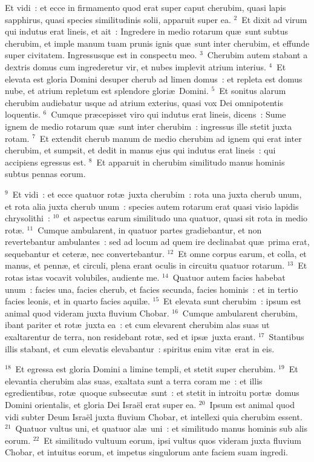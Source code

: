 \bchapter
\lettrine[lines=3,image=true,loversize=0.05,lraise=-0.03]{E}{}t vidi~: et ecce in firmamento quod erat super caput cherubim, quasi lapis sapphirus, quasi species similitudinis solii, apparuit super ea.
${}^{2}$~Et dixit ad virum qui indutus erat lineis, et ait~: Ingredere in medio rotarum qu\ae\ sunt subtus cherubim, et imple manum tuam prunis ignis qu\ae\ sunt inter cherubim, et effunde super civitatem. Ingressusque est in conspectu meo.
${}^{3}$~Cherubim autem stabant a dextris domus cum ingrederetur vir, et nubes implevit atrium interius.
${}^{4}$~Et elevata est gloria Domini desuper cherub ad limen domus~: et repleta est domus nube, et atrium repletum est splendore glori\ae\ Domini.
${}^{5}$~Et sonitus alarum cherubim audiebatur usque ad atrium exterius, quasi vox Dei omnipotentis loquentis.
${}^{6}$~Cumque pr\ae cepisset viro qui indutus erat lineis, dicens~: Sume ignem de medio rotarum qu\ae\ sunt inter cherubim~: ingressus ille stetit juxta rotam.
${}^{7}$~Et extendit cherub manum de medio cherubim ad ignem qui erat inter cherubim, et sumpsit, et dedit in manus ejus qui indutus erat lineis~: qui accipiens egressus est.
${}^{8}$~Et apparuit in cherubim similitudo manus hominis subtus pennas eorum.


${}^{9}$~Et vidi~: et ecce quatuor rot\ae\ juxta cherubim~: rota una juxta cherub unum, et rota alia juxta cherub unum~: species autem rotarum erat quasi visio lapidis chrysolithi~:
${}^{10}$~et aspectus earum similitudo una quatuor, quasi sit rota in medio rot\ae .
${}^{11}$~Cumque ambularent, in quatuor partes gradiebantur, et non revertebantur ambulantes~: sed ad locum ad quem ire declinabat qu\ae\ prima erat, sequebantur et ceter\ae , nec convertebantur.
${}^{12}$~Et omne corpus earum, et colla, et manus, et penn\ae , et circuli, plena erant oculis in circuitu quatuor rotarum.
${}^{13}$~Et rotas istas vocavit volubiles, audiente me.
${}^{14}$~Quatuor autem facies habebat unum~: facies una, facies cherub, et facies secunda, facies hominis~: et in tertio facies leonis, et in quarto facies aquil\ae .
${}^{15}$~Et elevata sunt cherubim~: ipsum est animal quod videram juxta fluvium Chobar.
${}^{16}$~Cumque ambularent cherubim, ibant pariter et rot\ae\ juxta ea~: et cum elevarent cherubim alas suas ut exaltarentur de terra, non residebant rot\ae , sed et ips\ae\ juxta erant.
${}^{17}$~Stantibus illis stabant, et cum elevatis elevabantur~: spiritus enim vit\ae\ erat in eis.


${}^{18}$~Et egressa est gloria Domini a limine templi, et stetit super cherubim.
${}^{19}$~Et elevantia cherubim alas suas, exaltata sunt a terra coram me~: et illis egredientibus, rot\ae\ quoque subsecut\ae\ sunt~: et stetit in introitu port\ae\ domus Domini orientalis, et gloria Dei Isra\"el erat super ea.
${}^{20}$~Ipsum est animal quod vidi subter Deum Isra\"el juxta fluvium Chobar, et intellexi quia cherubim essent.
${}^{21}$~Quatuor vultus uni, et quatuor al\ae\ uni~: et similitudo manus hominis sub alis eorum.
${}^{22}$~Et similitudo vultuum eorum, ipsi vultus quos videram juxta fluvium Chobar, et intuitus eorum, et impetus singulorum ante faciem suam ingredi.

